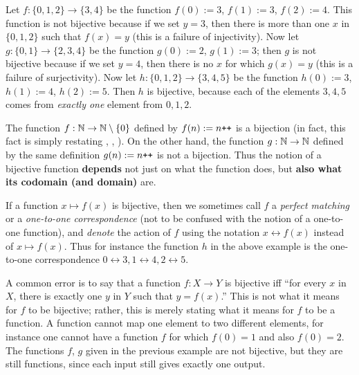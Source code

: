 \begin{example} \label{example 3.3.21}
Let \(f : \{0, 1, 2\} \rightarrow \{3, 4\} \) be the function \(f(0) := 3\), \(f(1) := 3\), \(f(2) := 4\).
This function is not bijective because if we set \(y = 3\),
then there is more than one \(x\) in \( \{0, 1, 2 \} \) such that \(f(x) = y\) (this is a failure of injectivity).
Now let \(g : \{0, 1\} \rightarrow \{2, 3, 4\} \) be the function \(g(0) := 2\), \(g(1) := 3\); then \(g\) is not bijective because if we set \(y = 4\),
then there is no \(x\) for which \(g(x) = y\) (this is a failure of surjectivity).
Now let \(h : \{0, 1, 2\} \rightarrow \{3, 4, 5\} \) be the function \(h(0) := 3\), \(h(1) := 4\), \(h(2) := 5\).
Then \(h\) is bijective, because each of the elements \(3, 4, 5\) comes from \emph{exactly one} element from \(0, 1, 2\).
\end{example}

\begin{example} \label{example 3.3.22}
The function \(f : \mathbb{N} \rightarrow \mathbb{N} \setminus \{0\} \) defined by \(f(n) := n\texttt{++}\) is a bijection (in fact, this fact is simply restating , , ).
On the other hand, the function \(g : \mathbb{N} \rightarrow \mathbb{N}\) defined by the same definition \(g(n) := n\texttt{++}\) is not a bijection.
Thus the notion of a bijective function \textbf{depends} not just on what the function does, but \textbf{also what its codomain (and domain)} are.
\end{example}

\begin{remark} \label{remark 3.3.23}
If a function \(x \mapsto f(x)\) is bijective, then we sometimes call \(f\) a \emph{perfect matching} or a \emph{one-to-one correspondence} (not to be confused with the notion of a one-to-one function),
and \emph{denote} the action of \(f\) using the notation \(x \leftrightarrow f(x)\) instead of \(x \mapsto f(x)\).
Thus for instance the function \(h\) in the above example is the one-to-one correspondence \(0 \leftrightarrow 3, 1 \leftrightarrow 4, 2 \leftrightarrow 5\).
\end{remark}

\begin{remark} \label{remark 3.3.24}
A common error is to say that a function \(f : X \rightarrow Y\) is bijective iff ``for every \(x\) in \(X\), there is exactly one \(y\) in \(Y\) such that \(y = f(x)\).''
This is not what it means for \(f\) to be bijective; rather, this is merely stating what it means for \(f\) to be a function.
A function cannot map one element to two different elements, for instance one cannot have a function \(f\) for which \(f(0) = 1\) and also \(f(0) = 2\).
The functions \(f\), \(g\) given in the previous example are not bijective, but they are still functions, since each input still gives exactly one output.
\end{remark}

